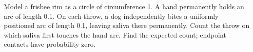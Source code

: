 Model a frisbee rim as a circle of circumference 1. A hand permanently holds an arc of length 0.1. On each throw, a dog independently bites a uniformly positioned arc of length 0.1, leaving saliva there permanently. Count the throw on which saliva first touches the hand arc. Find the expected count; endpoint contacts have probability zero.
